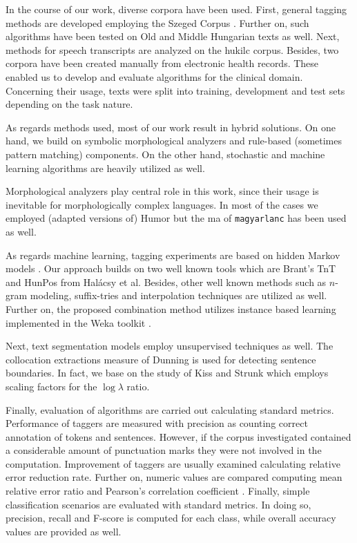 In the course of our work, diverse corpora have been used. 
First, general tagging methods are developed employing the Szeged Corpus \cite{Csendes2004}.
Further on, such algorithms have been tested on Old and Middle Hungarian \cite{Novak2013} texts as well.
Next, methods for speech transcripts are analyzed on the \acrshort{hukilc} corpus\cite{Matyus2014}.
Besides, two corpora have been created manually from electronic health records.
These enabled us to develop and evaluate algorithms for the clinical domain.
Concerning their usage, texts were split into training, development and test sets depending on the task nature.

As regards methods used, most of our work result in hybrid solutions.
On one hand, we build on symbolic morphological analyzers and rule-based (sometimes pattern matching) components. 
On the other hand, stochastic and machine learning algorithms are heavily utilized as well.

Morphological analyzers play central role in this work, since their usage is inevitable for morphologically complex languages.
In most of the cases we employed (adapted versions \cite{Novak2013,Orosz2013} of) Humor \cite{Novak2003,Proszeky1994} but the \acrshort{ma} of \texttt{magyarlanc} \cite{zsibrata2013magyarlanc} has been used as well.

As regards machine learning, tagging experiments are based on hidden Markov models \cite{Rabiner1989,Samuelsson1993}. 
Our approach builds on two well known tools which are Brant's TnT \cite{Brants2000} and HunPos \cite{Halacsy2007} from Halácsy et al. 
Besides, other well known methods such as $n$-gram modeling, suffix-tries and interpolation techniques are utilized as well.
Further on, the proposed combination method utilizes instance based learning \cite{Aha1991} implemented in the Weka toolkit \cite{Hall2009}.

Next, text segmentation models employ unsupervised techniques as well.
The collocation extractions measure of Dunning \cite{dunning1993accurate} is used for detecting sentence boundaries.
In fact, we base on the study of Kiss and Strunk \cite{kiss2006unsupervised} which employs scaling factors for the $\log\lambda$ ratio.

Finally, evaluation of algorithms are carried out calculating standard metrics.
Performance of taggers are measured with precision as counting correct annotation of tokens and sentences.
However, if the corpus investigated contained a considerable amount of punctuation marks they were not involved in the computation.
Improvement of taggers are usually examined calculating relative error reduction rate. 
Further on, numeric values are compared computing mean relative error \cite{Witten2011} ratio and Pearson's correlation coefficient \cite{Witten2011}.
Finally, simple classification scenarios are evaluated with standard metrics.
In doing so, precision, recall and F-score is computed for each class, while overall accuracy values are provided as well.